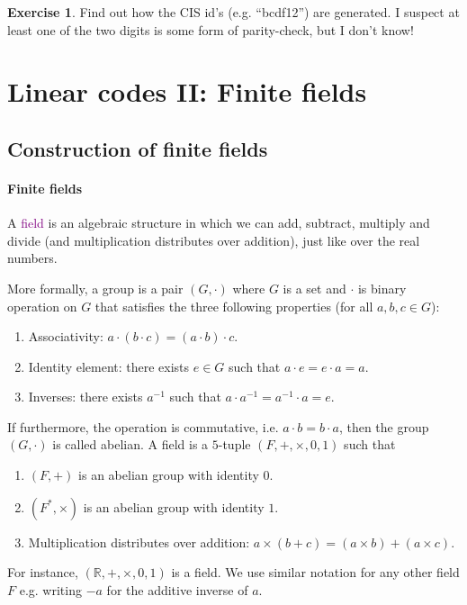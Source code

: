 \documentclass[a4paper, 11pt, openany]{book}
\numberwithin{equation}{section}
\theoremstyle{plain}
\theoremstyle{definition}
\newtheorem{exercise}   {Exercise}  [section]
\newcommand{\R}{\mathbb{R}}
\newcommand{\Define}[1]{\textcolor{purple}{#1}}
\begin{document}
\begin{exercise}
Find out how the CIS id's (e.g. ``bcdf12'') are generated. I suspect at least one of the two digits is some form of parity-check, but I don't know!
\end{exercise}










\section{Linear codes II: Finite fields}
\label{sec:22}



\subsection{Construction of finite fields}

\paragraph{Finite fields}
A \Define{field} is an algebraic structure in which we can add, subtract, multiply and divide (and multiplication distributes over addition), just like over the real numbers.


More formally, a group is a pair $(G, \cdot)$ where $G$ is a set and $\cdot$ is binary operation on $G$ that satisfies the three following properties (for all $a,b,c \in G$):
\begin{enumerate}
    \item Associativity: $a \cdot (b \cdot c) = (a \cdot b) \cdot c$.
    
    \item Identity element: there exists $e \in G$ such that $a \cdot e = e \cdot a = a$.
    
    \item Inverses: there exists $a^{-1}$ such that $a \cdot a^{-1} = a^{-1} \cdot a = e$.
\end{enumerate}
If furthermore, the operation is commutative, i.e. $a \cdot b = b \cdot a$, then the group $(G, \cdot)$ is called abelian. A field is a $5$-tuple $(F, +, \times, 0, 1)$ such that
\begin{enumerate}
    \item $(F, +)$ is an abelian group with identity $0$.
    
    \item $(F^*, \times)$ is an abelian group with identity $1$.
    
    \item Multiplication distributes over addition: $a \times (b + c) = (a \times b) + (a \times c)$.
\end{enumerate}
For instance, $(\R, +, \times, 0, 1)$ is a field. We use similar notation for any other field $F$ e.g. writing $-a$ for the additive inverse of $a$.
\end{document}
